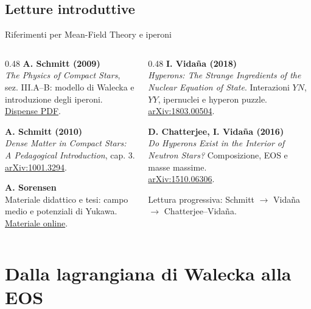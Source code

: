 \subsection{Letture introduttive}

\begin{frame}{Riferimenti per Mean-Field Theory e iperoni}
\footnotesize
\begin{columns}[T,onlytextwidth]
\begin{column}{0.48\textwidth}
\textbf{A. Schmitt (2009)}\\
\emph{The Physics of Compact Stars}, sez. III.A--B: modello di Walecka e introduzione degli iperoni.\\
\href{https://hep.itp.tuwien.ac.at/~aschmitt/stars.pdf}{Dispense PDF}.

\medskip
\textbf{A. Schmitt (2010)}\\
\emph{Dense Matter in Compact Stars: A Pedagogical Introduction}, cap. 3.\\
\href{https://arxiv.org/abs/1001.3294}{arXiv:1001.3294}.

\medskip
\textbf{A. Sorensen}\\
Materiale didattico e tesi: campo medio e potenziali di Yukawa.\\
\href{https://agnieszkasorensen.com/teaching.html}{Materiale online}.
\end{column}
\begin{column}{0.48\textwidth}
\textbf{I. Vida\~na (2018)}\\
\emph{Hyperons: The Strange Ingredients of the Nuclear Equation of State}. Interazioni $YN$, $YY$, ipernuclei e hyperon puzzle.\\
\href{https://arxiv.org/abs/1803.00504}{arXiv:1803.00504}.

\medskip
\textbf{D. Chatterjee, I. Vida\~na (2016)}\\
\emph{Do Hyperons Exist in the Interior of Neutron Stars?} Composizione, EOS e masse massime.\\
\href{https://arxiv.org/abs/1510.06306}{arXiv:1510.06306}.

\medskip
Lettura progressiva: Schmitt $\to$ Vida\~na $\to$ Chatterjee--Vida\~na.
\end{column}
\end{columns}
\end{frame}

\section{Dalla lagrangiana di Walecka alla EOS}

